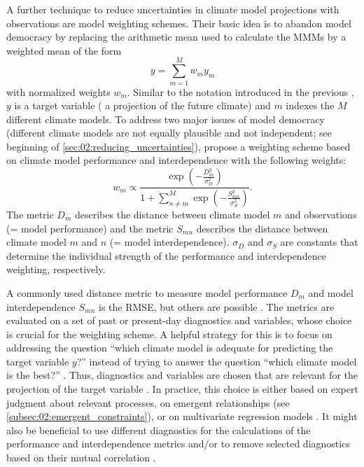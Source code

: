 A further technique to reduce uncertainties in climate model projections with
observations are model weighting schemes. Their basic idea is to abandon model
democracy by replacing the arithmetic mean used to calculate the \acp{MMM} by a
weighted mean of the form
\begin{equation}
  y = \sum_{m=1}^{M} w_m y_m
  \label{eq:02:weighted_mean}
\end{equation}
with normalized weights $w_m$. Similar to the notation introduced in the
previous , $y$ is a target variable
(\eg{} a projection of the future climate) and $m$ indexes the $M$ different
climate models. To address two major issues of model democracy (different
climate models are not equally plausible and not independent; see beginning of
\cref{sec:02:reducing_uncertainties}), \textcite{Knutti2017a} propose a
weighting scheme based on climate model performance and interdependence with
the following weights:
\begin{equation}
  w_m \propto \frac{\exp \left( -\frac{D_m^2}{\sigma_D^2} \right)}{1 + \sum_{n
    \neq m}^{M} \exp \left( -\frac{S_{mn}^2}{\sigma_S^2} \right)}.
  \label{eq:02:knutti_weights}
\end{equation}
The metric $D_m$ describes the distance between climate model $m$ and
observations (= model performance) and the metric $S_{mn}$ describes the
distance between climate model $m$ and $n$ (= model interdependence).
$\sigma_D$ and $\sigma_S$ are constants that determine the individual strength
of the performance and interdependence weighting, respectively.

A commonly used distance metric to measure model performance $D_m$ and model
interdependence $S_{mn}$ is the \ac{RMSE}, but others are possible
\autocite{Knutti2017a}. The metrics are evaluated on a set of past or
present-day diagnostics and variables, whose choice is crucial for the
weighting scheme. A helpful strategy for this is to focus on addressing the
question \enquote{which climate model is adequate for predicting the target
  variable $y$?} instead of trying to answer the question \enquote{which
  climate model is the best?} \autocite{Parker2009}. Thus, diagnostics and
variables are chosen that are relevant for the projection of the target
variable \autocite{Knutti2017a}. In practice, this choice is either based on
expert judgment about relevant processes, on emergent relationships (see
\cref{subsec:02:emergent_constraints}), or on multivariate regression models
. It
might also be beneficial to use different diagnostics for the calculations of
the performance and interdependence metrics \autocite{Merrifield2020} and/or to
remove selected diagnostics based on their mutual correlation
\autocite{Lorenz2018}.


